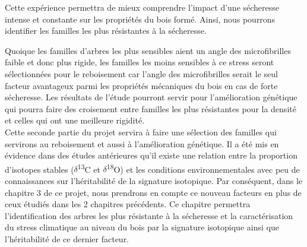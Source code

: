 \documentclass{report}
\newcommand{\Ctreize}{$\delta$\textsuperscript{13}C\xspace}
\newcommand{\Odixhuit}{$\delta$\textsuperscript{18}O\xspace}
\begin{document}
Cette expérience permettra de mieux comprendre l'impact d'une sécheresse intense et constante sur les propriétés du bois formé. Ainsi, nous pourrons identifier les familles les plus résistantes à la sécheresse. %

Quoique les familles d'arbres les plus sensibles aient un angle des microfibrilles faible et donc plus rigide, les familles les moins sensibles à ce stress seront sélectionnées pour le reboisement car l'angle des microfibrilles serait le seul facteur avantageux parmi les propriétés mécaniques du bois en cas de forte sécheresse. Les résultats de l'étude pourront servir pour l'amélioration génétique qui pourra faire des croisement entre familles les plus résistantes pour la densité et celles qui ont une meilleure rigidité.\\

Cette seconde partie du projet servira à faire une sélection des familles qui servirons au reboisement et aussi à l'amélioration génétique. Il a été mis en évidence dans des études antérieures qu'il existe une relation entre la proportion d'isotopes stables (\Ctreize et \Odixhuit) et les conditions environnementales avec peu de connaissances sur l'héritabilité de la signature isotopique.  Par conséquent, dans le chapitre 3 de ce projet, nous prendrons en compte ce nouveau facteurs en plus de ceux étudiés dans les 2 chapitres précédents. Ce chapitre permettra l'identification des arbres les plus résistante à la sécheresse et la caractérisation du stress climatique au niveau du bois par la signature isotopique ainsi que l'héritabilité de ce dernier facteur.
\end{document}
